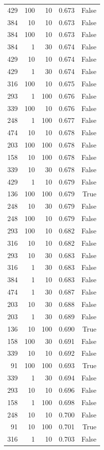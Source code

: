 \begin{tabular}{rrrrr}
429 & 100 & 10 & 0.673 & False \\
384 & 10 & 10 & 0.673 & False \\
384 & 100 & 10 & 0.673 & False \\
384 & 1 & 30 & 0.674 & False \\
429 & 10 & 10 & 0.674 & False \\
429 & 1 & 30 & 0.674 & False \\
316 & 100 & 10 & 0.675 & False \\
293 & 1 & 100 & 0.676 & False \\
339 & 100 & 10 & 0.676 & False \\
248 & 1 & 100 & 0.677 & False \\
474 & 10 & 10 & 0.678 & False \\
203 & 100 & 100 & 0.678 & False \\
158 & 10 & 100 & 0.678 & False \\
339 & 10 & 30 & 0.678 & False \\
429 & 1 & 10 & 0.679 & False \\
136 & 100 & 100 & 0.679 & True \\
248 & 10 & 30 & 0.679 & False \\
248 & 100 & 10 & 0.679 & False \\
293 & 100 & 10 & 0.682 & False \\
316 & 10 & 10 & 0.682 & False \\
293 & 10 & 30 & 0.683 & False \\
316 & 1 & 30 & 0.683 & False \\
384 & 1 & 10 & 0.683 & False \\
474 & 1 & 30 & 0.687 & False \\
203 & 10 & 30 & 0.688 & False \\
203 & 1 & 30 & 0.689 & False \\
136 & 10 & 100 & 0.690 & True \\
158 & 100 & 30 & 0.691 & False \\
339 & 10 & 10 & 0.692 & False \\
91 & 100 & 100 & 0.693 & True \\
339 & 1 & 30 & 0.694 & False \\
293 & 10 & 10 & 0.696 & False \\
158 & 1 & 100 & 0.698 & False \\
248 & 10 & 10 & 0.700 & False \\
91 & 10 & 100 & 0.701 & True \\
316 & 1 & 10 & 0.703 & False \\

\end{tabular}
